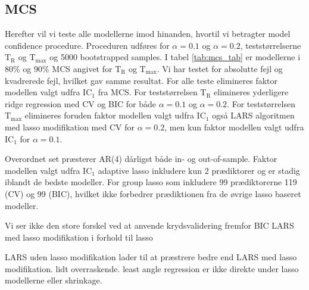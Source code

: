 \subsection{MCS} 
Herefter vil vi teste alle modellerne imod hinanden, hvortil vi betragter model confidence procedure.
Proceduren udføres for \(\alpha = 0.1\) og \(\alpha = 0.2\), teststørrelserne \(\text{T}_\text{R}\) og \(\text{T}_\text{max}\) og 5000 bootstrapped samples.
I tabel \ref{tab:mcs_tab} er modellerne i 80\% og 90\% MCS angivet for \(\text{T}_\text{R}\) og \(\text{T}_\text{max}\).
Vi har testet for absolutte fejl og kvadrerede fejl, hvilket gav samme resultat.
For alle teste elimineres faktor modellen valgt udfra IC\(_1\) fra MCS.
For teststørrelsen \(\text{T}_\text{R}\) elimineres yderligere ridge regression med CV og BIC for både \(\alpha = 0.1\) og \(\alpha = 0.2\).
For teststørrelsen \(\text{T}_\text{max}\) elimineres foruden faktor modellen valgt udfra IC\(_1\) også LARS algoritmen med lasso modifikation med CV for \(\alpha = 0.2\), men kun faktor modellen valgt udfra IC\(_1\) for \(\alpha = 0.1\).
%

%
Overordnet set præsterer AR(4) dårligst både in- og out-of-sample.
Faktor modellen valgt udfra IC\(_1\)
adaptive lasso inkludere kun 2 prædiktorer og er stadig iblandt de bedste modeller.
For group lasso som inkludere 99 prædiktorerne 119 (CV) og 99 (BIC), hvilket ikke forbedrer prædiktionen fra de øvrige lasso baseret modeller.

Vi ser ikke den store forskel ved at anvende krydsvalidering fremfor BIC
LARS med lasso modifikation i forhold til lasso 

LARS uden lasso modifikation lader til at præstrere bedre end LARS med lasso modifikation.
lidt overraskende.
least angle regression er ikke direkte under lasso modellerne eller shrinkage.


